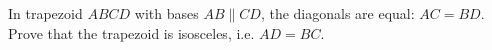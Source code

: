 In trapezoid $ABCD$ with bases $AB\parallel CD$, the diagonals are equal: $AC=BD$. Prove that the trapezoid is isosceles, i.e. $AD=BC$.
